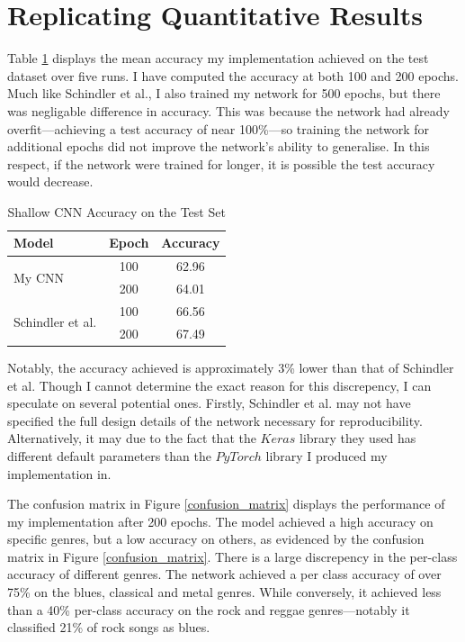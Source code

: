 \documentclass[conference]{IEEEtran}
\begin{document}
\section{Replicating Quantitative Results}

Table \ref{shallow_results} displays the mean accuracy my implementation achieved on the test dataset over five runs.
I have computed the accuracy at both 100 and 200 epochs.
Much like Schindler et al., I also trained my network for 500 epochs, but there was negligable difference in accuracy.
This was because the network had already overfit---achieving a test accuracy of near 100\%---so training the network for additional epochs did not improve the network's ability to generalise.
In this respect, if the network were trained for longer, it is possible the test accuracy would decrease.

\begin{table}[htbp]
    \caption{Shallow CNN Accuracy on the Test Set}
    \begin{center}
    \begin{tabular}{l c c}
    \toprule
    \textbf{Model}&\textbf{Epoch}&\textbf{Accuracy}\\
    \midrule
    \multirow{ 2}{*}{My CNN} & 100 & 62.96 \\
    & 200 & 64.01 \\
    \midrule
    \multirow{ 2}{*}{Schindler et al.} & 100 & 66.56\\
    & 200 & 67.49 \\
    \bottomrule
    \end{tabular}
    \label{shallow_results}
    \end{center}
\end{table}

Notably, the accuracy achieved is approximately 3\% lower than that of Schindler et al.
Though I cannot determine the exact reason for this discrepency, I can speculate on several potential ones.
Firstly, Schindler et al. may not have specified the full design details of the network necessary for reproducibility.
Alternatively, it may due to the fact that the $Keras$ library they used has different default parameters than the $PyTorch$ library I produced my implementation in.

The confusion matrix in Figure \ref{confusion_matrix} displays the performance of my implementation after 200 epochs.
The model achieved a high accuracy on specific genres, but a low accuracy on others, as evidenced by the confusion matrix in Figure \ref{confusion_matrix}.
There is a large discrepency in the per-class accuracy of different genres.
The network achieved a per class accuracy of over 75\% on the blues, classical and metal genres.
While conversely, it achieved less than a 40\% per-class accuracy on the rock and reggae genres---notably it classified 21\% of rock songs as blues.
\end{document}
